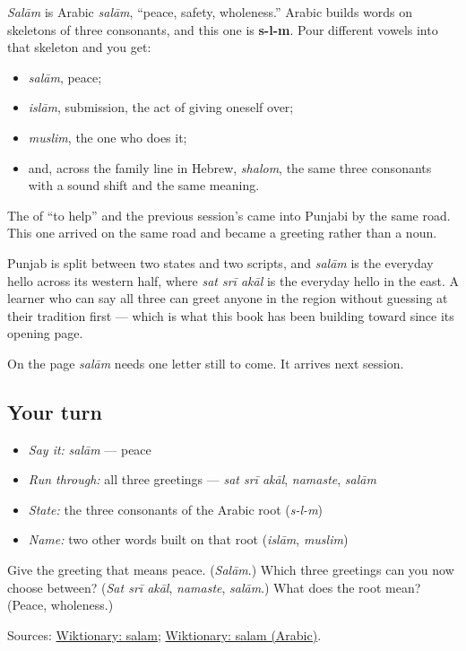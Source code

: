 \begin{cousinweb}
\emph{Salām} is Arabic \emph{salām}, \textquotedblleft{}peace, safety, wholeness.\textquotedblright{} Arabic builds words on skeletons of three consonants, and this one is \textbf{s-l-m}. Pour different vowels into that skeleton and you get:

\begin{itemize}
\raggedright
  \item \emph{salām}, peace;
  \item \emph{islām}, submission, the act of giving oneself over;
  \item \emph{muslim}, the one who does it;
  \item and, across the family line in Hebrew, \emph{shalom}, the same three consonants with a sound shift and the same meaning.
\end{itemize}

The \textbf{} of \textquotedblleft{}to help\textquotedblright{} and the previous session's \textbf{} came into Punjabi by the same road. This one arrived on the same road and became a greeting rather than a noun.

Punjab is split between two states and two scripts, and \emph{salām} is the everyday hello across its western half, where \emph{sat srī akāl} is the everyday hello in the east. A learner who can say all three can greet anyone in the region without guessing at their tradition first — which is what this book has been building toward since its opening page.

On the page \emph{salām} needs one letter still to come. It arrives next session.
\end{cousinweb}

\subsection*{Your turn}
\begin{itemize}
\raggedright
  \item \emph{Say it:} \emph{salām} — peace
  \item \emph{Run through:} all three greetings — \emph{sat srī akāl}, \emph{namaste}, \emph{salām}
  \item \emph{State:} the three consonants of the Arabic root (\emph{s-l-m})
  \item \emph{Name:} two other words built on that root (\emph{islām}, \emph{muslim})
\end{itemize}

\begin{tcolorbox}[breakable,colback=teal!4,colframe=teal!35!black,title={Before you move on}]
Give the greeting that means peace. (\emph{Salām}.) Which three greetings can you now choose between? (\emph{Sat srī akāl}, \emph{namaste}, \emph{salām}.) What does the root mean? (Peace, wholeness.)

Sources: \href{https://en.wiktionary.org/wiki/\%E0\%A8\%B8\%E0\%A8\%B2\%E0\%A8\%BE\%E0\%A8\%AE}{Wiktionary: salam}; \href{https://en.wiktionary.org/wiki/\%D8\%B3\%D9\%84\%D8\%A7\%D9\%85}{Wiktionary: salam (Arabic)}.
\end{tcolorbox}
